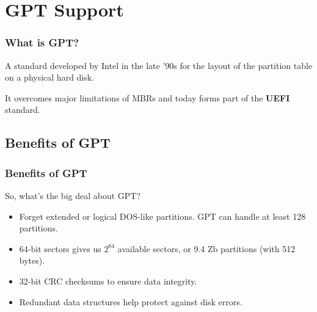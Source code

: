 
\section{GPT Support}
\begin{frame}\frametitle{What is GPT?}
  A standard developed by Intel in the late '90s for the layout of the partition table on a physical hard disk.\newline

  It overcomes major limitations of MBRs and today forms part of the \textbf{UEFI} standard.
\end{frame}

\subsection{Benefits of GPT}
\begin{frame}\frametitle{Benefits of GPT}
  So, what's the big deal about GPT?
  \begin{itemize}
  \item Forget extended or logical DOS-like partitions. GPT can handle at least 128 partitions.
  \item 64-bit sectors gives us $2^{64}$ available sectors, or 9.4 Zb partitions (with 512 bytes).
  \item 32-bit CRC checksums to ensure data integrity.
  \item Redundant data structures help protect against disk errors.
  \end{itemize}
\end{frame}

